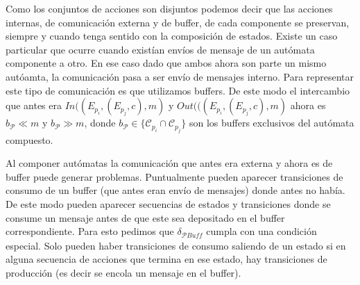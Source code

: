 \begin{definition}
Como los conjuntos de acciones son disjuntos podemos decir que las acciones internas, de comunicación externa y de buffer, de cada componente se preservan, siempre y cuando tenga sentido con la composición de estados. Existe un caso particular que ocurre cuando existían envíos de mensaje de un autómata componente a otro. En ese caso dado que ambos ahora son parte un mismo autóamta, la comunicación pasa a ser envío de mensajes interno. Para representar este tipo de comunicación es que utilizamos buffers. De este modo el intercambio que antes era $In((E_{p_i},(E_{p_j},c),m)$ y $Out(((E_{p_i},(E_{p_j},c),m)$ ahora es $b_{\mathcal{P}}  \ll m$ y $b_{\mathcal{P}}  \gg  m$, donde $ b_{\mathcal{P}} \in \{ \mathcal{C}_{p_i} \cap \mathcal{C}_{p_j} \} $ son los buffers exclusivos del autómata compuesto. 

Al componer autómatas la comunicación que antes era externa y ahora es de buffer puede generar problemas. Puntualmente pueden aparecer transiciones de consumo de un buffer (que antes eran envío de mensajes) donde antes no había. De este modo pueden aparecer secuencias de estados y transiciones donde se consume un mensaje antes de que este sea depositado en el buffer correspondiente. Para esto pedimos que $\delta_\mathit{\mathcal{P}Buff}$ cumpla con una condición especial. Solo pueden haber transiciones de consumo saliendo de un estado si en alguna secuencia de acciones que termina en ese estado, hay transiciones de producción (es decir se encola un mensaje en el buffer).

\end{definition}




